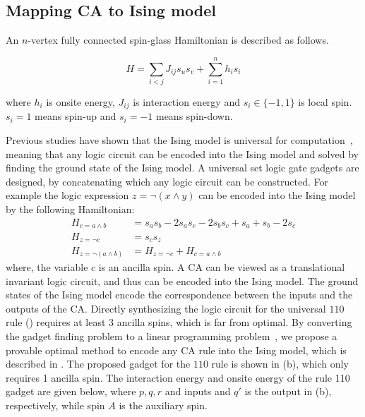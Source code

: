 \documentclass[twocolumn,superscriptaddress,english,showpacs,longbibliography]{revtex4-2}
\begin{document}
\subsection{Mapping CA to Ising model}

An $n$-vertex fully connected spin-glass Hamiltonian is described as follows.

\begin{equation}
H = \sum_{i < j} J_{ij}s_us_v + \sum_{i=1}^{n}h_i s_i
\end{equation}

where $h_i$ is onsite energy, $J_{ij}$ is interaction energy and
$s_i \in \{-1, 1\}$ is local spin. $s_i=1$ means spin-up and $s_i=-1$ means spin-down.

Previous studies have shown that the Ising model is universal for computation~\cite{Aadit2022, onizawa2020design, camsari2017stochastic}, meaning that any logic circuit can be encoded into the Ising model and solved by finding the ground state of the Ising model. A universal set logic gate gadgets are designed, by concatenating which any logic circuit can be constructed.
For example the logic expression $z = \neg (x \land y)$ can be encoded into the Ising model by the following Hamiltonian:
\begin{equation}
    \begin{split}
        H_{c = a \land b} &= s_a s_b -2 s_a s_c -2 s_bs_c + s_a + s_b -2 s_c\\
        H_{z = \neg c} &= s_c s_z\\
        H_{z = \neg (a \land b)} &= H_{z = \neg c} + H_{c = a \land b}
    \end{split}
\end{equation}
where, the variable $c$ is an ancilla spin.
A CA can be viewed as a translational invariant logic circuit, and thus can be encoded into the Ising model. The ground states of the Ising model encode the correspondence between the inputs and the outputs of the CA.
Directly synthesizing the logic circuit for the universal $110$ rule () requires at least 3 ancilla spins, which is far from optimal. By converting the gadget finding problem to a linear programming problem~\cite{}, we propose a provable optimal method to encode any CA rule into the Ising model, which is described in .
The proposed gadget for the $110$ rule is shown in (b), which only requires 1 ancilla spin.
The interaction energy and onsite energy of the rule 110 gadget are given below, where $p, q, r$ and inputs and $q'$ is the output in (b), respectively, while spin $A$ is the auxiliary spin.
\end{document}
